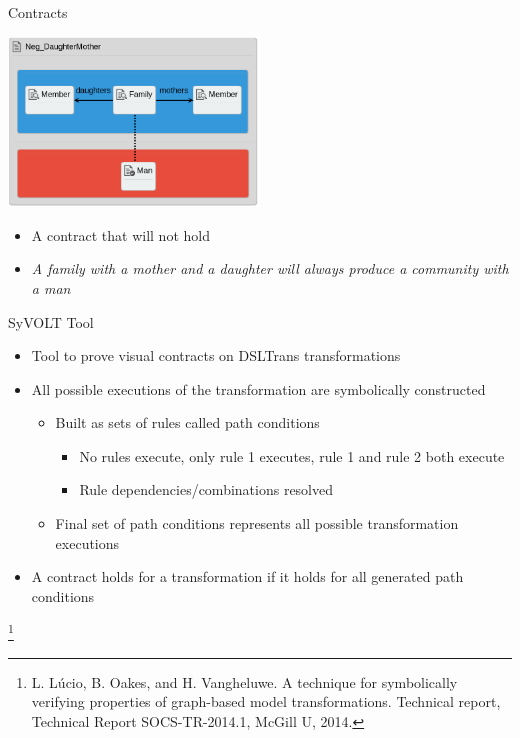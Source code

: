 \documentclass[xcolor=dvipsnames, 12pt, handout]{beamer}
\newcommand\blfootnote[1]{%
  \begingroup
  \renewcommand\thefootnote{}\footnote{#1}%
  \addtocounter{footnote}{-1}%
  \endgroup
}
\begin{document}
\begin{frame}{Contracts}
\begin{center}
\includegraphics[width=0.5\textwidth]{figures/Pos_DaughterMother}
\end{center}
\begin{itemize}[<+->]
\item A contract that will not hold
\item \textit{A family with a mother and a daughter will always produce a community with a man}
\end{itemize}
\end{frame}


\begin{frame}{SyVOLT Tool}
\begin{itemize}[<+->]
\item Tool to prove visual contracts on DSLTrans transformations
\item All possible executions of the transformation are symbolically constructed
\begin{itemize}[<+->]
\item Built as sets of rules called path conditions
\begin{itemize}
\item No rules execute, only rule 1 executes, rule 1 and rule 2 both execute
\item Rule dependencies/combinations resolved
\end{itemize}
\item Final set of path conditions represents all possible transformation executions
\end{itemize}
\item A contract holds for a transformation if it holds for all generated path conditions
\end{itemize}
\blfootnote{L. Lúcio, B. Oakes, and H. Vangheluwe. A technique for symbolically verifying properties of graph-based model transformations. Technical report, Technical Report SOCS-TR-2014.1, McGill U, 2014.}
\end{frame}
\end{document}

